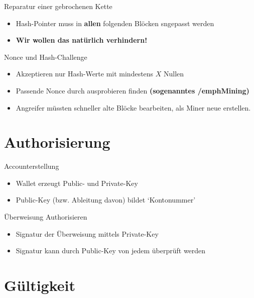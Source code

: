 \documentclass[aspectratio=169]{beamer}
\begin{document}
\begin{frame}{Reparatur einer gebrochenen Kette}
    \begin{itemize}
        \item Hash-Pointer muss in \textbf{allen} folgenden Blöcken sngepasst werden
        \pause
        \item \textbf{Wir wollen das natürlich verhindern!}
    \end{itemize}
\end{frame}


\begin{frame}{Nonce und Hash-Challenge}
    \begin{itemize}
        \item Akzeptieren nur Hash-Werte mit mindestens $X$ Nullen
        \item Passende Nonce durch ausprobieren finden \textbf{(sogenanntes /emph{Mining})}
        \item Angreifer müssten schneller alte Blöcke bearbeiten, als Miner neue erstellen.
    \end{itemize}
\end{frame}






\section{Authorisierung}

\begin{frame}{Accounterstellung}
		\begin{itemize}
				\item Wallet erzeugt Public- und Private-Key
				\item Public-Key (bzw. Ableitung davon) bildet `Kontonummer'
		\end{itemize}
\end{frame}


\begin{frame}{Überweisung Authorisieren}
		\begin{itemize}
				\item Signatur der Überweisung mittels Private-Key
				\item Signatur kann durch Public-Key von jedem überprüft werden
		\end{itemize}
\end{frame}





\section{Gültigkeit}
\end{document}
